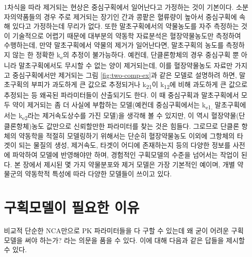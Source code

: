 \documentclass[
  11pt,
  krantz2, a4paper, twoside]{krantz}
\theoremstyle{definition}
\theoremstyle{definition}
\theoremstyle{definition}
\theoremstyle{definition}
\theoremstyle{remark}
\begin{document}
1차식을 따라 제거되는 현상은 중심구획에서 일어난다고 가정하는 것이
기본이다. 소분자의약품들의 경우 주로 제거되는 장기인 간과 콩팥은
혈류량이 높아서 중심구획에 속해 있다고 가정하는데 무리가 없다. 또한
말초구획에서의 약물농도를 자주 측정하는 것이 기술적으로 어렵기 때문에
대부분의 약동학 자료분석은 혈장약물농도만 측정하여 수행하는데, 만약
말초구획에서 약물의 제거가 일어난다면, 말초구획의 농도를 측정하지 않는
한 정확한 k\textsubscript{e}의 추정이 불가능하다. 예컨데, 단클론항체의 경우 중심구획
뿐 아니라 말초구획에서도 무시할 수 없는 양이 제거되는데, 이를
혈장약물농도 자료만 가지고 중심구획에서만 제거되는 그림 \ref{fig:two-comp-ex}과 같은
모델로 설명하려 하면, 말초구획의 부피가 과도하게 큰 값으로 추정되거나
k\textsubscript{21}이 k\textsubscript{12}에 비해 과도하게 큰 값으로 추정되는 등 왜곡된 파라미터들이
산출되기도 한다. 이 때 중심구획과 말초구획에서 모두 약이 제거되는 좀 더
사실에 부합하는 모델(예컨데 중심구획에서는 k\textsubscript{e1,} 말초구획에서는
k\textsubscript{e2}라는 제거속도상수를 가진 모델)을 생각해 볼 수 있지만, 이 역시 혈장약물(단클론항체)농도 값만으로 신뢰할만한 파라미터를 찾는 것은 힘들다.
그로므로 단클론 항체의 약동학을 적절히 모델링하기 위해서는 단순히 혈장약물농도 이외에 그항체의 타겟이 되는 물질의 생성, 제거속도, 타겟이 어디에 존재하는지 등의 다양한 정보를 사전에 파악하여 모델에 반영해야만 하며, 경험적인 구획모델의 수준을 넘어서는 작업이 된다.
본 장에서 제시된 몇 가지 약물분포와 제거 모델은 가장 기본적인 예이며, 개별 약물군의 약동학적 특성에 따라 다양한 모델들이 쓰이고 있다.

\hypertarget{uxad6cuxd68duxbaa8uxb378uxc774-uxd544uxc694uxd55c-uxc774uxc720}{%
\section{구획모델이 필요한 이유}\label{uxad6cuxd68duxbaa8uxb378uxc774-uxd544uxc694uxd55c-uxc774uxc720}}

비교적 단순한 NCA만으로 PK 파라미터들을 다 구할 수 있는데 왜 굳이 어려운 구획모델을 써야 하는가? 라는 의문을 품을 수 있다.
이에 대해 다음과 같은 답들을 제시할 수 있다.
\end{document}
